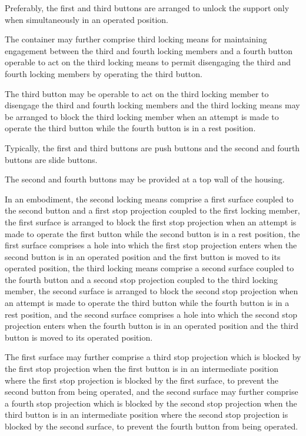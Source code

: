 \documentclass[11pt,a4paper]{article}
\begin{document}
Preferably, the first and third buttons are arranged to unlock the support only when simultaneously in an operated position.

The container may further comprise third locking means for maintaining engagement between the third and fourth locking members and a fourth button operable to act on the third locking means to permit disengaging the third and fourth locking members by operating the third button.

The third button may be operable to act on the third locking member to disengage the third and fourth locking members and the third locking means may be arranged to block the third locking member when an attempt is made to operate the third button while the fourth button is in a rest position.

Typically, the first and third buttons are push buttons and the second and fourth buttons are slide buttons.

The second and fourth buttons may be provided at a top wall of the housing.

In an embodiment, the second locking means comprise a first surface coupled to the second button and a first stop projection coupled to the first locking member, the first surface is arranged to block the first stop projection when an attempt is made to operate the first button while the second button is in a rest position, the first surface comprises a hole into which the first stop projection enters when the second button is in an operated position and the first button is moved to its operated position, the third locking means comprise a second surface coupled to the fourth button and a second stop projection coupled to the third locking member, the second surface is arranged to block the second stop projection when an attempt is made to operate the third button while the fourth button is in a rest position, and the second surface comprises a hole into which the second stop projection enters when the fourth button is in an operated position and the third button is moved to its operated position.

The first surface may further comprise a third stop projection which is blocked by the first stop projection when the first button is in an intermediate position where the first stop projection is blocked by the first surface, to prevent the second button from being operated, and the second surface may further comprise a fourth stop projection which is blocked by the second stop projection when the third button is in an intermediate position where the second stop projection is blocked by the second surface, to prevent the fourth button from being operated.
\end{document}
